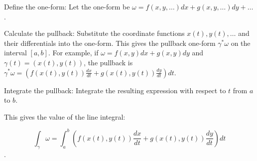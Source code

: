 Define the one-form: Let the one-form be \(\omega =f(x,y,\dots )dx+g(x,y,\dots )dy+\dots \). 

Calculate the pullback: Substitute the coordinate functions \(x(t),y(t),\dots \) and their differentials into the one-form. This gives the pullback one-form \(\gamma ^{*}\omega \) on the interval \([a,b]\). For example, if \(\omega =f(x,y)dx+g(x,y)dy\) and \(\gamma (t)=(x(t),y(t))\), the pullback is \(\gamma ^{*}\omega =(f(x(t),y(t))\frac{dx}{dt}+g(x(t),y(t))\frac{dy}{dt})dt\).

Integrate the pullback: Integrate the resulting expression with respect to \(t\) from \(a\) to \(b\). 

This gives the value of the line integral: 

\[\int _{\gamma }\omega =\int _{a}^{b}(f(x(t),y(t))\frac{dx}{dt}+g(x(t),y(t))\frac{dy}{dt})dt\].

